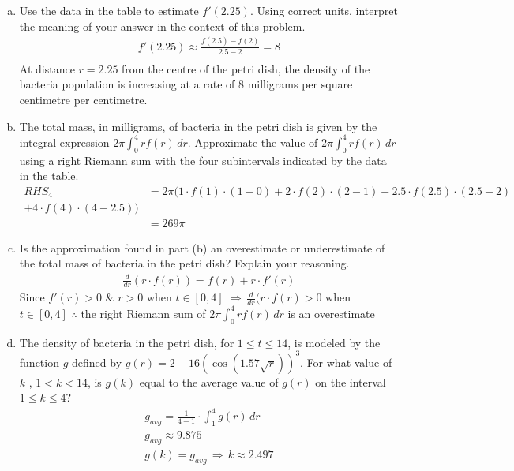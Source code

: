 \documentclass[11pt,letterpaper]{article}
\begin{document}
\begin{enumerate} [a.)]
    \item Use the data in the table to estimate $f'(2.25)$. Using correct units, interpret the meaning of your answer in the context of this problem.
    \begin{align*}
        f'(2.25)\approx \frac{f(2.5)-f(2)}{2.5-2}=8 \\
    \end{align*}
At distance $r=2.25$ from the centre of the petri dish, the density of the bacteria population is increasing at a rate of 8 milligrams per square centimetre per centimetre.
\item The total mass, in milligrams, of bacteria in the petri dish is given by the integral expression $2\pi \int_{0}^4 rf(r)\,dr$. Approximate the value of $2\pi \int_{0}^4 rf(r)\,dr$ using a right Riemann sum with the four subintervals indicated by the data in the table.
\begin{align*}
    RHS_{4} & = 2\pi(1\cdot f(1)\cdot(1-0)+2\cdot f(2)\cdot(2-1)+2.5\cdot f(2.5)\cdot(2.5-2)\\+4\cdot f(4)\cdot(4-2.5))\\
     & = 269\pi
    \end{align*}
    \item Is the approximation found in part (b) an overestimate or underestimate of the total mass of bacteria in the petri dish? Explain your reasoning.
    \begin{align*}
        \frac{d}{dr}(r\cdot f(r))=f(r)+r\cdot f'(r)
    \end{align*}
    Since $f'(r)>0$ \& $r > 0$ when $t \in [0,4]$ $ \Longrightarrow \, \frac{d}{dr}(r\cdot f(r)>0$ when $t \in [0,4]$ $\therefore$ the right Riemann sum of $2\pi \int_{0}^4 rf(r)\,dr$ is an overestimate 
    \item The density of bacteria in the petri dish, for $1\leq t \le 1  4$, is modeled by the function $g$ defined by $g(r)=2-16(\cos(1.57\sqrt{r}))^3$. For what value of $k$ , $1<k<1  4$, is $g(k)$ equal to the average value of $g(r)$ on the interval $1\leq k \leq4$?
    \begin{align*}
        g_{avg}=\frac{1}{4-1} \cdot \int_{1}^{4} g(r) \, dr \\
          g_{avg} \approx 9.875\\
          g(k) = g_{avg} \, \Longrightarrow \, k\approx 2.497
    \end{align*}
\end{enumerate}
\end{document}
